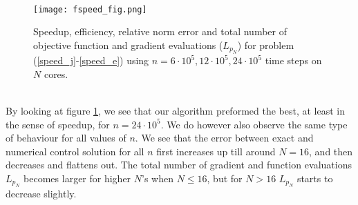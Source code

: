 \\
\begin{figure}[!h]
\centering
\texttt{[image: fspeed\_fig.png]}
\centering
\caption{Speedup, efficiency, relative norm error and total number of objective function and gradient evaluations  ($L_{p_N}$) for problem (\ref{speed_j}-\ref{speed_e}) using $n=6\cdot 10^5,12\cdot 10^5,24\cdot 10^5$ time steps on $N$ cores. }
\label{speed_fig1}
\end{figure}
\\
By looking at figure \ref{speed_fig1}, we see that our algorithm preformed the best, at least in the sense of speedup, for $n=24\cdot 10^5$. We do however also observe the same type of behaviour for all values of $n$. We see that the error between exact and numerical control solution for all $n$ first increases up till around $N=16$, and then decreases and flattens out. The total number of gradient and function evaluations $L_{p_N}$ becomes larger for higher $N$'s when $N\leq 16$, but for $N>16$ $L_{p_N}$ starts to decrease slightly. 
